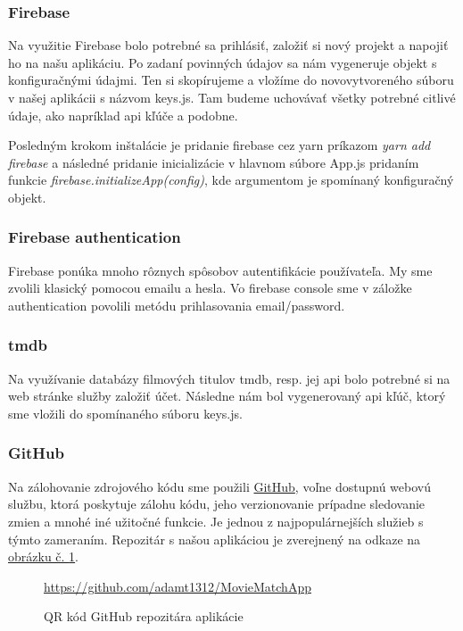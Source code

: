 \subsubsection{Firebase}
Na využitie Firebase bolo potrebné sa prihlásiť, založiť si nový projekt a napojiť ho na našu aplikáciu. Po zadaní povinných údajov sa nám vygeneruje objekt s konfiguračnými údajmi. Ten si skopírujeme a vložíme do novovytvoreného súboru v našej aplikácii s názvom keys.js. Tam budeme uchovávať všetky potrebné citlivé údaje, ako napríklad \acrshort{api} kľúče a podobne.

Posledným krokom inštalácie je pridanie firebase cez yarn príkazom \textit{yarn add firebase} a následné pridanie inicializácie v hlavnom súbore App.js pridaním funkcie \textit{firebase.initializeApp(config)}, kde argumentom je spomínaný konfiguračný objekt.
\subsubsection{Firebase authentication}
Firebase ponúka mnoho rôznych spôsobov autentifikácie používateľa. My sme zvolili klasický pomocou emailu a hesla. Vo firebase console sme v záložke authentication povolili metódu prihlasovania email/password. 
\subsubsection{\acrshort{tmdb}}
Na využívanie databázy filmových titulov \acrshort{tmdb}, resp. jej \acrshort{api} bolo potrebné si na web stránke služby založiť účet. Následne nám bol vygenerovaný \acrshort{api} kľúč, ktorý sme vložili do spomínaného súboru keys.js. 
\subsubsection{GitHub}
Na zálohovanie zdrojového kódu sme použili \href{https://github.com/}{GitHub}, voľne dostupnú webovú službu, ktorá poskytuje zálohu kódu, jeho verzionovanie prípadne sledovanie zmien a mnohé iné užitočné funkcie. Je jednou z najpopulárnejších služieb s týmto zameraním. Repozitár s našou aplikáciou je zverejnený na odkaze na \hyperref[ghqrcode]{obrázku č. \ref{ghqrcode}}. 

\begin{figure}[hbt!]
  \centering   
  \def\stackalignment{c}
           {\scriptsize%
            \url{https://github.com/adamt1312/MovieMatchApp}}
	\caption{QR kód GitHub repozitára aplikácie}  
  \label{ghqrcode}
\end{figure}

